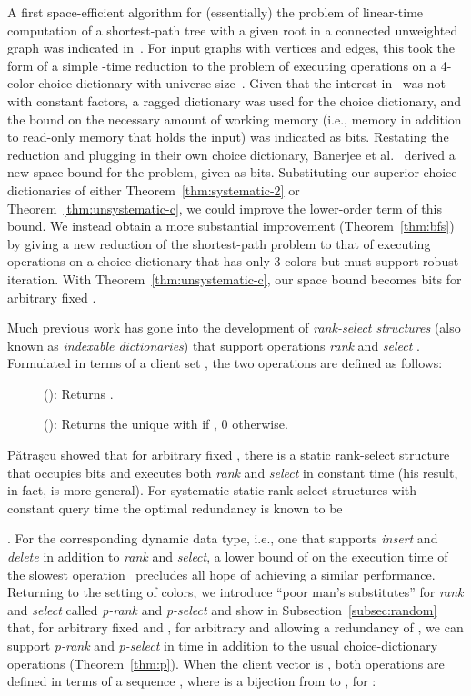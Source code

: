 \documentclass[envcountsame,envcountsect,undated,nolinenumbers]{lnthi}
\def\Tvn#1{\hbox{\textit{#1\/}}}
\begin{document}
A first space-efficient algorithm
for (essentially) the problem of linear-time
computation of a
shortest-path tree with a given root in a connected
unweighted graph was indicated in~\cite[Theorem 5.1]{ElmHK15}.
For input graphs with  vertices and  edges,
this took the form of a simple -time
reduction
to the problem of executing  operations on a
4-color choice dictionary with universe size~.
Given that the interest in~\cite{ElmHK15} was not
with constant factors, a ragged dictionary was used
for the choice dictionary, and the bound on the
necessary amount of working memory
(i.e., memory in addition to read-only memory
that holds the input)
was indicated as  bits.
Restating the reduction and plugging in their own
choice dictionary, Banerjee et al.~\cite{BanCR16} derived a new
space bound for the problem, given as  bits.
Substituting our superior choice dictionaries of
either Theorem~\ref{thm:systematic-2} or
Theorem~\ref{thm:unsystematic-c}, we could
improve the lower-order term of this bound.
We instead obtain a more substantial
improvement (Theorem~\ref{thm:bfs}) by giving a new reduction of the
shortest-path problem to that of executing
 operations on a
choice dictionary that has only 3 colors
but must support robust iteration.
With Theorem~\ref{thm:unsystematic-c}, our space
bound becomes  bits
for arbitrary fixed .

Much previous work has gone into the development of
\emph{rank-select structures} (also known as
\emph{indexable dictionaries}) that support
operations \Tvn{rank} and \Tvn{select}
\cite{Jac89}.
Formulated in terms of a client set
,
the two operations
are defined as follows:

\begin{description}
\item[\normalfont]
():
Returns .
\item[\normalfont]
():
Returns the unique  with 
if , 0 otherwise.
\end{description}

P\v atra\c scu showed that for
arbitrary fixed , there is a
static rank-select structure that occupies
 bits and executes
both \Tvn{rank} and \Tvn{select} in constant time
\cite[Theorem~2]{Pat08} (his result, in fact, is more general).
For systematic static rank-select structures
with constant query time
the optimal redundancy is known to be

\cite{Gol07,RamRS07}.
For the corresponding dynamic data type,
i.e., one that supports \Tvn{insert} and
\Tvn{delete} in addition to \Tvn{rank}
and \Tvn{select}, a lower bound of
 on the execution
time of the slowest operation~\cite{FreS89}
precludes all hope of achieving a similar performance.
Returning to the setting of  colors,
we introduce ``poor man's substitutes'' for
\Tvn{rank} and \Tvn{select} called
\Tvn{p-rank} and \Tvn{p-select} and show
in Subsection~\ref{subsec:random} that,
for arbitrary fixed  and
, for arbitrary
 and allowing a redundancy of
,
we can support \Tvn{p-rank} and \Tvn{p-select}
in  time in addition
to the usual choice-dictionary operations
(Theorem~\ref{thm:p}).
When the client vector is ,
both operations are defined in terms of a
sequence , where
 is a bijection from  to
, for :
\end{document}
